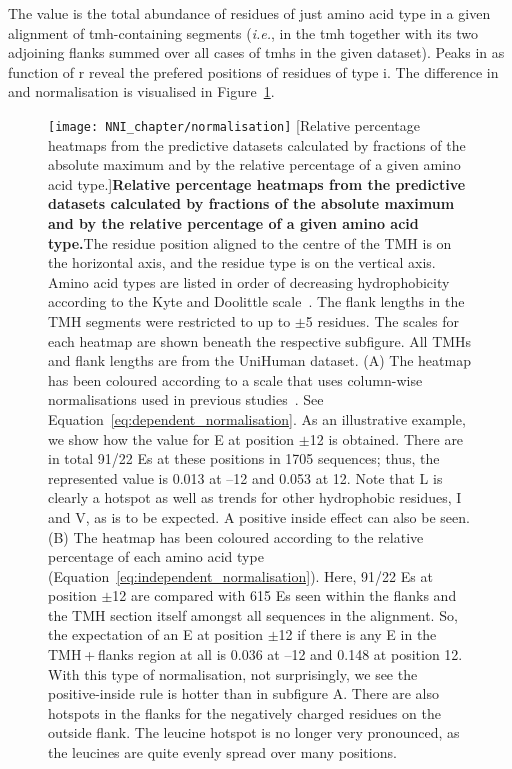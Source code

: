 The value  is the total abundance of residues of just amino acid type  in a given alignment of \gls{tmh}-containing segments (\textit{i.e.}, in the \gls{tmh} together with its two adjoining flanks summed over all cases of \gls{tmh}s in the given dataset). Peaks in as function of r reveal the prefered positions of residues of type i. The difference in   and   normalisation is visualised in Figure~\ref{fig:normalisation}.

\begin{figure}[!ht]
\centering
\texttt{[image: NNI\_chapter/normalisation]}
[Relative percentage heatmaps from the predictive datasets calculated by fractions of the absolute maximum and by the relative percentage of a given amino acid type.]{\textbf{Relative percentage heatmaps from the predictive datasets calculated by fractions of the absolute maximum and by the relative percentage of a given amino acid type.}The residue position aligned to the centre of the TMH is on the horizontal axis, and the residue type is on the vertical axis. Amino acid types are listed in order of decreasing hydrophobicity according to the Kyte and Doolittle scale~\cite{Kyte1982}. The flank lengths in the TMH segments were restricted to up to $\pm$5 residues. The scales for each heatmap are shown beneath the respective subfigure. All TMHs and flank lengths are from the UniHuman dataset. (A) The heatmap has been coloured according to a scale that uses column-wise normalisations used in previous studies~\cite{Sharpe2010}. See Equation~\ref{eq:dependent_normalisation}. As an illustrative example, we show how the value for E at position $\pm$12 is obtained. There are in total 91/22 Es at these positions in 1705 sequences; thus, the represented value is 0.013 at –12 and 0.053 at 12. Note that L is clearly a hotspot as well as trends for other hydrophobic residues, I and V, as is to be expected. A positive inside effect can also be seen. (B) The heatmap has been coloured according to the relative percentage of each amino acid type (Equation~\ref{eq:independent_normalisation}). Here, 91/22 Es at position $\pm$12 are compared with 615 Es seen within the flanks and the TMH section itself amongst all sequences in the alignment. So, the expectation of an E at position $\pm$12 if there is any E in the TMH + flanks region at all is 0.036 at –12 and 0.148 at position 12. With this type of normalisation, not surprisingly, we see the positive-inside rule is hotter than in subfigure A. There are also hotspots in the flanks for the negatively charged residues on the outside flank. The leucine hotspot is no longer very pronounced, as the leucines are quite evenly spread over many positions.}

\label{fig:normalisation}
\end{figure}

